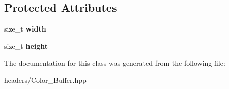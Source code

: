\subsection*{Protected Attributes}
\begin{DoxyCompactItemize}
\item 
\mbox{\label{class_project1__3_d_a_1_1_color___buffer_a9d61719876db4a65c8de67f769f22b1e}} 
size\+\_\+t {\bfseries width}
\item 
\mbox{\label{class_project1__3_d_a_1_1_color___buffer_a5a5b707414011fe613014823989c45e6}} 
size\+\_\+t {\bfseries height}
\end{DoxyCompactItemize}


The documentation for this class was generated from the following file\+:\begin{DoxyCompactItemize}
\item 
headers/Color\+\_\+\+Buffer.\+hpp\end{DoxyCompactItemize}
